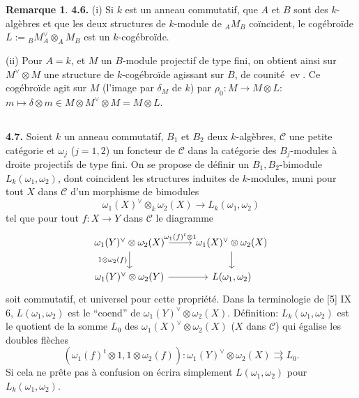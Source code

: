 \documentclass[12pt,a4paper]{article}
\theoremstyle{plain}
\theoremstyle{definition}
\newtheorem{remark}[theorem]{Remarque}
\theoremstyle{remark}
\DeclareMathOperator{\ev}{ev}
\begin{document}
\begin{remark}
\textbf{4.6.} (i) Si $k$ est un anneau commutatif, que $A$ et $B$ sont des $k$-algèbres et que les deux structures de $k$-module de ${}_A M_B$ coïncident, le cogébroïde $L := {}_B M_A^\vee \otimes_A M_B$ est un $k$-cogébroïde.

(ii) Pour $A = k$, et $M$ un $B$-module projectif de type fini, on obtient ainsi sur $M^\vee \otimes M$ une structure de $k$-cogébroïde agissant sur $B$, de counité $\ev$. Ce cogébroïde agit sur $M$ (l'image par $\delta_M$ de $k$) par $\rho_0 : M \to M \otimes L$: $m \mapsto \delta \otimes m \in M \otimes M^\vee \otimes M = M \otimes L$.
\end{remark}

\subsection{}

\textbf{4.7.} Soient $k$ un anneau commutatif, $B_1$ et $B_2$ deux $k$-algèbres, $\mathcal{C}$ une petite catégorie et $\omega_j$ ($j = 1,2$) un foncteur de $\mathcal{C}$ dans la catégorie des $B_j$-modules à droite projectifs de type fini. On se propose de définir un $B_1,B_2$-bimodule $L_k(\omega_1,\omega_2)$, dont coincident les structures induites de $k$-modules, muni pour tout $X$ dans $\mathcal{C}$ d'un morphisme de bimodules
\begin{equation}\label{eq:4.7.1}
\omega_1(X)^\vee \otimes_k \omega_2(X) \longrightarrow L_k(\omega_1,\omega_2)
\end{equation}
tel que pour tout $f : X \to Y$ dans $\mathcal{C}$ le diagramme
\begin{equation}\label{eq:4.7.2}
\begin{tikzcd}
\omega_1(Y)^\vee \otimes \omega_2(X) \arrow[r, "{\omega_1(f)^t \otimes 1}"] \arrow[d, "1 \otimes \omega_2(f)"'] & \omega_1(X)^\vee \otimes \omega_2(X) \arrow[d] \\
\omega_1(Y)^\vee \otimes \omega_2(Y) \arrow[r] & L(\omega_1,\omega_2)
\end{tikzcd}
\end{equation}
soit commutatif, et universel pour cette propriété. Dans la terminologie de [5] IX 6, $L(\omega_1,\omega_2)$ est le ``coend'' de $\omega_1(Y)^\vee \otimes \omega_2(X)$. Définition: $L_k(\omega_1,\omega_2)$ est le quotient de la somme $L_0$ des $\omega_1(X)^\vee \otimes \omega_2(X)$ ($X$ dans $\mathcal{C}$) qui égalise les doubles flèches
\[
(\omega_1(f)^t \otimes 1, 1 \otimes \omega_2(f)) : \omega_1(Y)^\vee \otimes \omega_2(X) \rightrightarrows L_0.
\]
Si cela ne prête pas à confusion on écrira simplement $L(\omega_1,\omega_2)$ pour $L_k(\omega_1,\omega_2)$.
\end{document}
